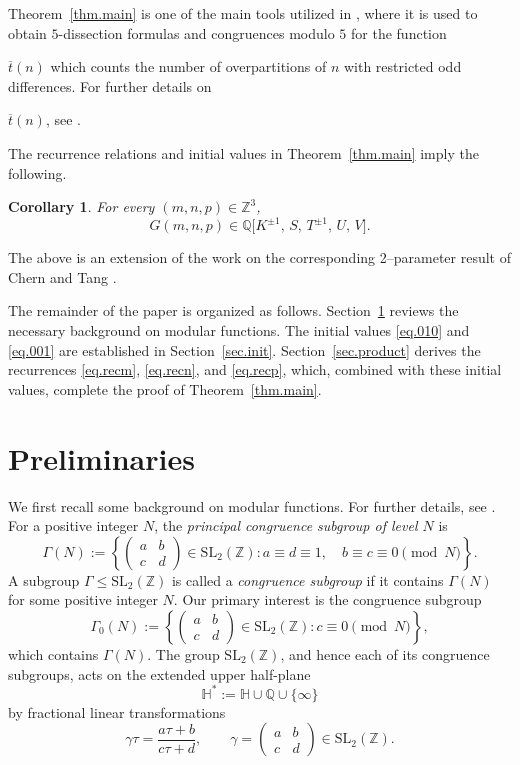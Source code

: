 \documentclass{amsart}
\newtheorem{corollary}[theorem]{Corollary}
\theoremstyle{definition}
\newcommand{\smat}[4]{\left(\begin{smallmatrix}#1&#2\\#3&#4\end{smallmatrix}\right)}
\begin{document}
Theorem~\ref{thm.main} is one of the main tools {utilized} in \cite{PSW}, where it is used
to obtain $5$-dissection formulas and congruences modulo $5$ for {the} function {$\overline{t}(n)$ which counts the number of overpartitions of $n$ with restricted odd differences. For further details on {$\overline{t}(n)$, see \cite{BDLM, HS2023}. 

The recurrence relations and initial values in
Theorem~\ref{thm.main} imply the following.
\begin{corollary}
For every $(m,n,p)\in\mathbb{Z}^{3}$,
\begin{equation*}
G(m,n,p)\in
\mathbb{Q}\bigl[K^{\pm1},\,S,\,T^{\pm1},\,U,\,V\bigr].
\end{equation*}
\end{corollary}

{The above is an extension of the work on the corresponding 2--parameter result of Chern and Tang \cite[Corollaries 1.5 and 1.6]{CT2021}.}

The remainder of the paper is organized as follows.
Section~\ref{sec.prelim} reviews the {necessary} background on modular functions. The initial values \eqref{eq.010} and \eqref{eq.001} are
established in Section~\ref{sec.init}. Section~\ref{sec.product} derives the
recurrences \eqref{eq.recm}, \eqref{eq.recn}, and \eqref{eq.recp},  which, combined with these initial values, complete the proof of
Theorem~\ref{thm.main}. 

\section{Preliminaries}\label{sec.prelim}
We first recall some background on modular functions. For
further details, see \cite{DS,Ono2004}. For a positive integer $N$, the \emph{principal congruence subgroup
of level $N$} is
\begin{equation*}
\Gamma(N):=
\left\{
\smat abcd\in\mathrm{SL}_{2}(\mathbb{Z}) :
a\equiv d\equiv1,\quad b\equiv c\equiv0\pmod N
\right\}.
\end{equation*}
A subgroup $\Gamma\leq\mathrm{SL}_{2}(\mathbb{Z})$ is called a
\emph{congruence subgroup} if it contains $\Gamma(N)$ for some
positive integer $N$. Our primary interest is the congruence subgroup
\begin{equation*}
\Gamma_{0}(N):=
\left\{
\smat abcd\in\mathrm{SL}_{2}(\mathbb{Z}) :
c\equiv0\pmod N
\right\}, 
\end{equation*}
which contains $\Gamma(N)$. The group $\mathrm{SL}_{2}(\mathbb{Z})$, and hence each of its
congruence subgroups, acts on the extended upper half-plane
\begin{equation*}
\mathbb{H}^{*}:=\mathbb{H}\cup\mathbb{Q}\cup\{\infty\}
\end{equation*}
by fractional linear transformations
\begin{equation*}
\gamma\tau=\frac{a\tau+b}{c\tau+d},
\qquad
\gamma=\smat abcd\in\mathrm{SL}_{2}(\mathbb{Z}).
\end{equation*}

}}
\end{document}
